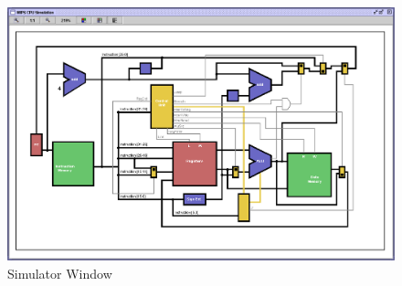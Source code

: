 \begin{figure}[H]
	\begin{center}
		\includegraphics{graphics/Simulator.eps}
	\end{center}
	\caption{\label{fig:Simulator} Simulator Window}
\end{figure}
